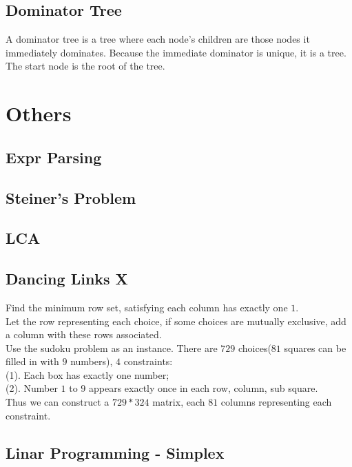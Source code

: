 ﻿\documentclass[10pt]{article}
\begin{document}
{\subsection{Dominator Tree}
\noindent
A dominator tree is a tree where each node's children are those nodes it immediately dominates. Because the immediate dominator is unique, it is a tree. The start node is the root of the tree.

\section{Others}
% 
\subsection{Expr Parsing}

\subsection{Steiner's Problem}

\subsection{LCA}

\subsection{Dancing Links X}

Find the minimum row set, satisfying each column has exactly one $1$. \\
Let the row representing each choice, if some choices are mutually exclusive, add a column with these rows associated. \\
Use the sudoku problem as an instance. There are $729$ choices($81$ squares can be filled in with $9$ numbers), $4$ constraints:\\
(1). Each box has exactly one number; \\
(2). Number $1$ to $9$ appears exactly once in each row, column, sub square. \\
Thus we can construct a $729*324$ matrix, each $81$ columns representing each constraint.\\
\subsection{Linar Programming - Simplex}

}
\end{document}
